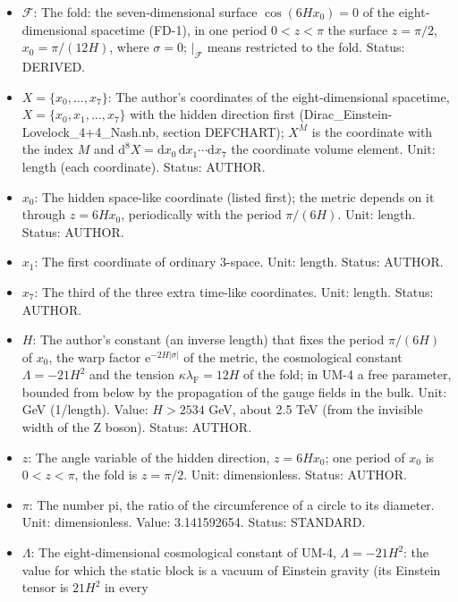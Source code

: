 \documentclass[
  10pt,
]{article}
\providecommand{\tightlist}{%
  \setlength{\itemsep}{0pt}\setlength{\parskip}{0pt}}
\begin{document}
\begin{itemize}
\tightlist
\item
  \(\mathcal{F}\): The fold: the seven-dimensional surface
  \(\cos(6Hx_0) = 0\) of the eight-dimensional spacetime (FD-1), in one
  period \(0 < z < \pi\) the surface \(z = \pi/2\), \(x_0 = \pi/(12H)\),
  where \(\sigma = 0\); \(\vert_{\mathcal{F}}\) means restricted to the
  fold. Status: DERIVED.
\item
  \(X = \{x_0, \dots, x_7\}\): The author's coordinates of the
  eight-dimensional spacetime, \(X = \{x_0, x_1, \dots, x_7\}\) with the
  hidden direction first (Dirac\_Einstein-Lovelock\_4+4\_Nash.nb,
  section DEFCHART); \(X^M\) is the coordinate with the index \(M\) and
  \(\mathrm{d}^8X = \mathrm{d}x_0\,\mathrm{d}x_1\cdots\mathrm{d}x_7\)
  the coordinate volume element. Unit: length (each coordinate). Status:
  AUTHOR.
\item
  \(x_0\): The hidden space-like coordinate (listed first); the metric
  depends on it through \(z = 6Hx_0\), periodically with the period
  \(\pi/(6H)\). Unit: length. Status: AUTHOR.
\item
  \(x_1\): The first coordinate of ordinary 3-space. Unit: length.
  Status: AUTHOR.
\item
  \(x_7\): The third of the three extra time-like coordinates. Unit:
  length. Status: AUTHOR.
\item
  \(H\): The author's constant (an inverse length) that fixes the period
  \(\pi/(6H)\) of \(x_0\), the warp factor
  \(\mathrm{e}^{-2H\lvert\sigma\rvert}\) of the metric, the cosmological
  constant \(\Lambda = -21H^2\) and the tension
  \(\kappa\lambda_{\mathrm{F}} = 12H\) of the fold; in UM-4 a free
  parameter, bounded from below by the propagation of the gauge fields
  in the bulk. Unit: GeV (1/length). Value: \(H > 2534\) GeV, about 2.5
  TeV (from the invisible width of the Z boson). Status: AUTHOR.
\item
  \(z\): The angle variable of the hidden direction, \(z = 6Hx_0\); one
  period of \(x_0\) is \(0 < z < \pi\), the fold is \(z = \pi/2\). Unit:
  dimensionless. Status: AUTHOR.
\item
  \(\pi\): The number pi, the ratio of the circumference of a circle to
  its diameter. Unit: dimensionless. Value: 3.141592654. Status:
  STANDARD.
\item
  \(\Lambda\): The eight-dimensional cosmological constant of UM-4,
  \(\Lambda = -21H^2\): the value for which the static block is a vacuum
  of Einstein gravity (its Einstein tensor is \(21H^2\) in every

\end{itemize}
\end{document}
